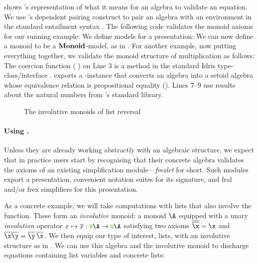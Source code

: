  shows
\Frexlib{}'s representation of what it means for an algebra
to validate an equation. We use \idris{}'s dependent
pairing construct to pair an algebra with an environment in the
standard entailment syntax \ModelEnv{}.
The following code validates the monoid axioms
for our running example:
We define models for a presentation:
%
We can now define a monoid to be a $\mathbf{Monoid}$-model, as in
. For another example, now putting everything together,
we validate the monoid structure of multiplication as follows:
\label{cast explanation}
The coercion function %
( \IdrisKeyword{:}  \IdrisKeyword{->} ) %
on Line 3 is a method in the standard Idris type-class/interface
 .  \Frexlib{} exports a
-instance that converts an algebra into a setoid
algebra whose equivalence relation is propositional equality
(\IdrisKeyword{=}).  Lines 7--9 use results about the natural numbers
from \idris{}'s standard library.

\begin{figure}
  \ListInvMonoid{}
  \caption{The involutive monoids of list reversal}
\end{figure}

\paragraph{Using \Frexlib{}.}
Unless they are already working abstractly with an algebraic structure,
we expect that in practice users start by recognising that their concrete
algebra validates the axioms of an existing simplification
module---\emph{frexlet} for short. Such modules export a presentation,
convenient notation suites for its signature, and fral and/or frex simplifiers
for this presentation.

As a concrete example, we will take computations with lists
that also involve the  function. These form an
\emph{involutive} monoid: a monoid $\A$ equipped with a unary
\emph{involution} operator $x\mapsto\overline x : \U\A \to \U\A$
satisfying two axioms $\overline{\overline \x} = \x$ and
$\overline{\x\y} = \overline\y\,\overline\x$. We then equip our type
of interest, lists, with an involutive structure as in
. We can use this algebra and the involutive
monoid to discharge equations containing list variables and concrete
lists: \InvMonoidFrexExample[numbers=right, numbersep=-.125cm]

